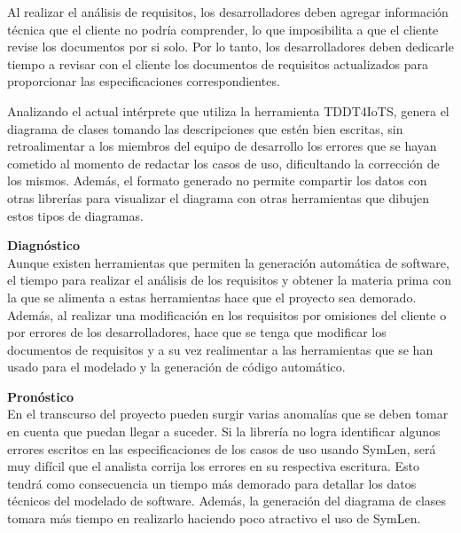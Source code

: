 \newpage 

 Al realizar el análisis de requisitos, los desarrolladores deben agregar información técnica que el cliente no podría comprender, lo que imposibilita a que el cliente revise los documentos por si solo. Por lo tanto, los desarrolladores deben dedicarle tiempo a revisar con el cliente los documentos de requisitos actualizados para proporcionar las especificaciones correspondientes.

Analizando el actual intérprete que utiliza la herramienta TDDT4IoTS, genera el diagrama de clases tomando las descripciones que estén bien escritas, sin retroalimentar a los miembros del equipo de desarrollo los errores que se hayan cometido al momento de redactar los casos de uso, dificultando la corrección de los mismos. Además, el formato generado no permite compartir los datos con otras librerías para visualizar el diagrama con otras herramientas que dibujen estos tipos de diagramas. 

\textbf{Diagnóstico} \\
Aunque existen herramientas que permiten la generación automática de software, el tiempo para realizar el análisis de los requisitos y obtener la materia prima con la que se alimenta a estas herramientas hace que el proyecto sea demorado. Además, al realizar una modificación en los requisitos por omisiones del cliente o por errores de los desarrolladores, hace que se tenga que modificar los documentos de requisitos y a su vez realimentar a las herramientas que se han usado para el modelado y la generación de código automático. 

\textbf{Pronóstico} \\
En el transcurso del proyecto pueden surgir varias anomalías que se deben tomar en cuenta que puedan llegar a suceder. Si la librería no logra identificar algunos errores escritos en las especificaciones de los casos de uso usando SymLen, será muy difícil que el analista corrija los errores en su respectiva escritura. Esto tendrá como consecuencia un tiempo más demorado para detallar los datos técnicos del modelado de software. Además, la generación del diagrama de clases tomara más tiempo en realizarlo haciendo poco atractivo el uso de SymLen.


